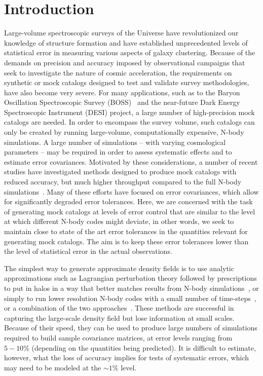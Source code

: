 \section{Introduction}

Large-volume spectroscopic surveys of the Universe have revolutionized
our knowledge of structure formation and have established unprecedented
levels of statistical error in measuring various aspects of galaxy
clustering. Because of the demands on precision and accuracy imposed
by observational campaigns that seek to investigate the nature of
cosmic acceleration, the requirements on synthetic or mock catalogs
designed to test and validate survey methodologies, have also become
very severe. For many applications, such as to the Baryon Oscillation
Spectroscopic Survey (BOSS)~\cite{2013AJ....145...10D} and the near-future
Dark Energy Spectroscopic Instrument (DESI) project, a large number
of high-precision mock catalogs are needed. In order to encompass
the survey volume, such catalogs can only be created by running large-volume,
computationally expensive, N-body simulations. A large number of simulations
-- with varying cosmological parameters -- may be required in order
to assess systematic effects and to estimate error covariances. Motivated
by these considerations, a number of recent studies have investigated
methods designed to produce mock catalogs with reduced accuracy, but
much higher throughput compared to the full N-body simulations~\cite{2002ApJ...564....8M,2002MNRAS.331..587M,2008MNRAS.391..435F,2013AN....334..691R,2013arXiv1312.2013C,2013JCAP...06..036T,2014MNRAS.437.2594W,2013MNRAS.433.2389M,2001A&A...367...18H,2009ApJ...701..945S,2014MNRAS.439L..21K,2014arXiv1409.1124C}.
Many of these efforts have focused on error covariances, which allow
for significantly degraded error tolerances. Here, we are concerned
with the task of generating mock catalogs at levels of error control
that are similar to the level at which different N-body codes might
deviate, in other words, we seek to maintain close to state of the
art error tolerances in the quantities relevant for generating mock
catalogs. The aim is to keep these error tolerances lower than the
level of statistical error in the actual observations.

The simplest way to generate approximate density fields is to use
analytic approximations such as Lagrangian perturbation theory followed
by prescriptions to put in halos in a way that better matches results
from N-body simulations~\cite{2013MNRAS.428.1036M,2014arXiv1401.4171M},
or simply to run lower resolution N-body codes with a small number
of time-steps~\cite{2013JCAP...06..036T}, or a combination of the
two approaches~\cite{2014MNRAS.437.2594W}. These methods are successful
in capturing the large-scale density field but lose information at
small scales. Because of their speed, they can be used to produce
large numbers of simulations required to build sample covariance matrices,
at error levels ranging from $5-10\%$ (depending on the quantities
being predicted). It is difficult to estimate, however, what the loss
of accuracy implies for tests of systematic errors, which may need
to be modeled at the $\sim1\%$ level.


